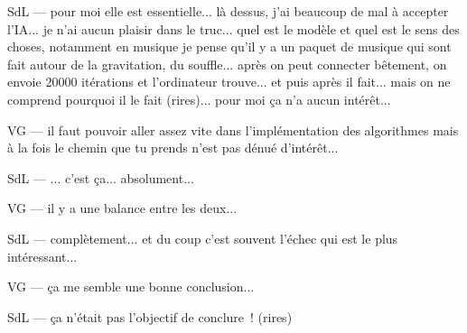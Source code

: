 SdL — pour moi elle est essentielle... là dessus, j'ai beaucoup de mal à accepter l'IA... je n'ai aucun plaisir dans le truc... quel est le modèle et quel est le sens des choses, notamment en musique je pense qu'il y a un paquet de musique qui sont fait autour de la gravitation, du souffle... après on peut connecter bêtement, on envoie 20000 itérations et l'ordinateur trouve... et puis après il fait... mais on ne comprend pourquoi il le fait (rires)... pour moi ça n'a aucun intérêt... 

VG — il faut pouvoir aller assez vite dans l'implémentation des algorithmes mais à la fois le chemin que tu prends n'est pas dénué d'intérêt... 

SdL — ... c'est ça... absolument... 

VG — il y a une balance entre les deux... 

SdL — complètement... et du coup c'est souvent l'échec qui est le plus intéressant...  

VG — ça me semble une bonne conclusion...  

SdL — ça n'était pas l'objectif de conclure ! (rires) 


